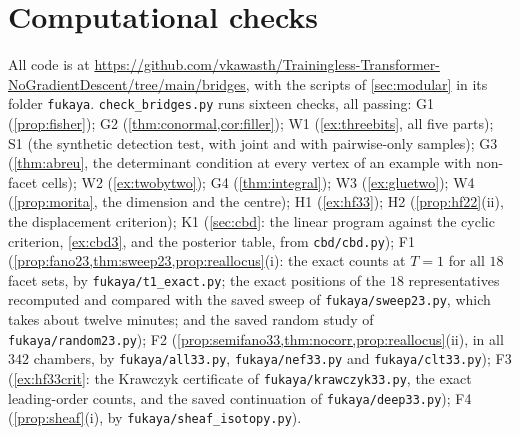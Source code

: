 \documentclass[11pt]{article}
\theoremstyle{definition}
\theoremstyle{remark}
\begin{document}
\section{Computational checks}\label{sec:code}

All code is at \url{https://github.com/vkawasth/Trainingless-Transformer-NoGradientDescent/tree/main/bridges}, with the scripts of \cref{sec:modular} in its folder \texttt{fukaya}. \texttt{check\_bridges.py} runs sixteen checks, all passing: G1 (\cref{prop:fisher}); G2 (\cref{thm:conormal,cor:filler}); W1
(\cref{ex:threebits}, all five parts); S1 (the synthetic detection test, with joint and with pairwise-only samples); G3 (\cref{thm:abreu}, the determinant condition at every vertex
of an example with non-facet cells); W2 (\cref{ex:twobytwo}); G4 (\cref{thm:integral}); W3 (\cref{ex:gluetwo}); W4 (\cref{prop:morita}, the
dimension and the centre); H1 (\cref{ex:hf33}); H2 (\cref{prop:hf22}(ii), the displacement criterion); K1 (\cref{sec:cbd}: the linear program against the cyclic criterion, \cref{ex:cbd3},
and the posterior table, from \texttt{cbd/cbd.py}); F1 (\cref{prop:fano23,thm:sweep23,prop:reallocus}(i): the exact counts at $T=1$ for all $18$ facet sets, by \texttt{fukaya/t1\_exact.py};
the exact positions of the $18$ representatives recomputed and compared with the saved sweep of \texttt{fukaya/sweep23.py}, which takes about twelve
minutes; and the saved random study of \texttt{fukaya/random23.py}); F2 (\cref{prop:semifano33,thm:nocorr,prop:reallocus}(ii), in all $342$ chambers, by
\texttt{fukaya/all33.py}, \texttt{fukaya/nef33.py} and \texttt{fukaya/clt33.py}); F3 (\cref{ex:hf33crit}: the Krawczyk certificate of
\texttt{fukaya/krawczyk33.py}, the exact leading-order counts, and the saved continuation of \texttt{fukaya/deep33.py}); F4 (\cref{prop:sheaf}(i), by \texttt{fukaya/sheaf\_isotopy.py}).
\end{document}
